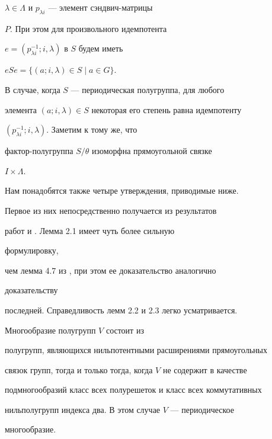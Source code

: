 $\lambda \in \Lambda$ и $p_{\lambda i}$ --- элемент сэндвич-матрицы


$P$. При этом для произвольного идемпотента 


$e = (p_{\lambda i}^{-1}; i, \lambda)$ в $S$ будем иметь


$eSe = \{ (a; i, \lambda) \in S \mid a \in G \}$.


В случае, когда $S$ --- периодическая полугруппа, для любого


элемента $(a; i, \lambda) \in S$ некоторая его степень равна идемпотенту


$(p_{\lambda i}^{-1}; i, \lambda)$. Заметим к тому же, что


фактор-полугруппа $S / \theta$ изоморфна прямоугольной связке


$I \times \Lambda$.





Нам понадобятся также четыре утверждения, приводимые ниже.


Первое из них непосредственно получается из результатов


работ \cite{Chri} и \cite{Sap}. Лемма 2.1 имеет чуть более сильную


формулировку,


чем лемма 4.7 из \cite{Rep2}, при этом ее доказательство аналогично


доказательству


последней. Справедливость лемм 2.2 и 2.3 легко усматривается.







\begin{lemm} Многообразие полугрупп $V$ состоит из


полугрупп, являющихся нильпотентными расширениями прямоугольных


связок групп, тогда и только тогда, когда $V$ не содержит в качестве


подмногообразий класс всех полурешеток и класс всех коммутативных


нильполугрупп индекса два. В этом случае $V$ --- периодическое


многообразие.


\end{lemm}







